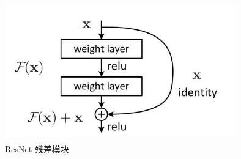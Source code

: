 \begin{figure}[h]
  \centering
  \includegraphics[width=10cm, height=6cm]{Img/resnet.jpg}
  \caption{ResNet 残差模块}
  \label{fig:resnet}
\end{figure}

